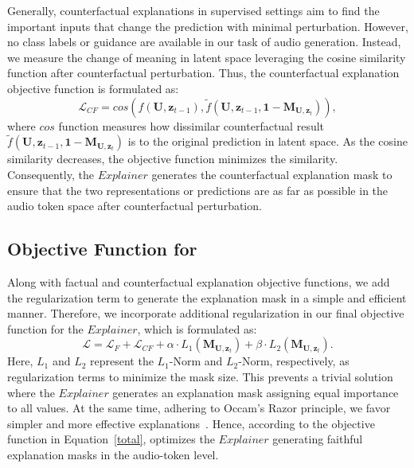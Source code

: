 Generally, counterfactual explanations in supervised settings aim to find the important inputs that change the prediction with minimal perturbation. However, no class labels or guidance are available in our task of audio generation. Instead, we measure the change of meaning in latent space leveraging the cosine similarity function after counterfactual perturbation. Thus, the counterfactual explanation objective function is formulated as:
\begin{equation}
    \mathcal{L}_{CF} = cos(f(\textbf{U}, \textbf{z}_{t-1}), \tilde{f}(\textbf{U}, \textbf{z}_{t-1}, \textbf{1}-\textbf{M}_{\textbf{U}, \textbf{z}_{t}})),
    \label{cfact}
\end{equation}
\noindent where $cos$ function measures how dissimilar counterfactual result $\tilde{f}(\textbf{U}, \textbf{z}_{t-1}, \textbf{1}-\textbf{M}_{\textbf{U}, \textbf{z}_{t}})$ is to the original prediction in latent space. As the cosine similarity decreases, the objective function minimizes the similarity. Consequently, the $Explainer$ generates the counterfactual explanation mask to ensure that the two representations or predictions are as far as possible in the audio token space after counterfactual perturbation.

\subsection{Objective Function for \mname{}} 
Along with factual and counterfactual explanation objective functions, we add the regularization term to generate the explanation mask in a simple and efficient manner. Therefore, we incorporate additional regularization in our final objective function for the $Explainer$, which is formulated as:
\begin{equation}
    \mathcal{L} = \mathcal{L}_{F} + \mathcal{L}_{CF} + \alpha \cdot L_1(\textbf{M}_{\textbf{U}, \textbf{z}_{t}})+ \beta \cdot L_2(\textbf{M}_{\textbf{U}, \textbf{z}_{t}}).
    \label{total}
\end{equation}
Here, $L_1$ and $L_2$ represent the $L_1$-Norm and $L_2$-Norm, respectively, as regularization terms to minimize the mask size. This prevents a trivial solution where the $Explainer$ generates an explanation mask assigning equal importance to all values. At the same time, adhering to Occam’s Razor principle, we favor simpler and more effective explanations~\cite{tan2022learning, blumer1987occam}. Hence, according to the objective function in Equation~\eqref{total}, \mname{} optimizes the $Explainer$ generating faithful explanation masks in the audio-token level.

